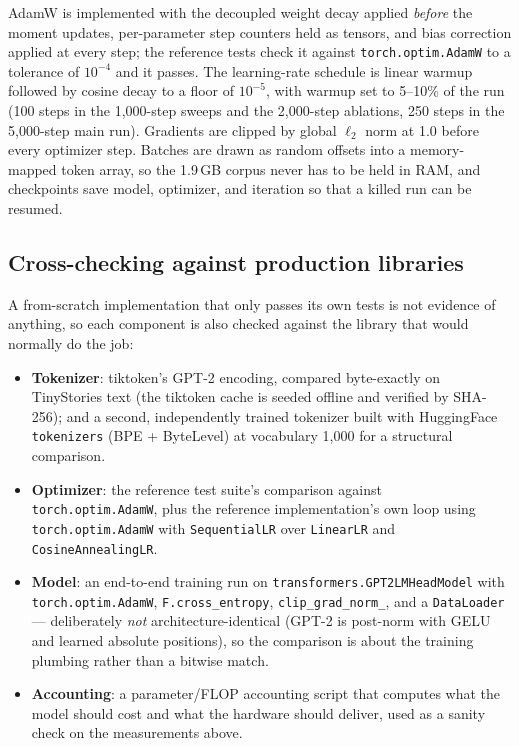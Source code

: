 \documentclass{article}
\begin{document}
AdamW \citep{adamw} is implemented with the decoupled weight decay applied \emph{before} the moment updates, per-parameter step counters held as tensors, and bias correction applied at every step; the reference tests check it against \texttt{torch.optim.AdamW} to a tolerance of $10^{-4}$ and it passes. The learning-rate schedule is linear warmup followed by cosine decay to a floor of $10^{-5}$, with warmup set to 5--10\% of the run (100 steps in the 1{,}000-step sweeps and the 2{,}000-step ablations, 250 steps in the 5{,}000-step main run). Gradients are clipped by global $\ell_2$ norm at 1.0 before every optimizer step. Batches are drawn as random offsets into a memory-mapped token array, so the 1.9\,GB corpus never has to be held in RAM, and checkpoints save model, optimizer, and iteration so that a killed run can be resumed.

\subsection{Cross-checking against production libraries}
\label{sec:xcheck}

A from-scratch implementation that only passes its own tests is not evidence of anything, so each component is also checked against the library that would normally do the job:

\begin{itemize}
  \item \textbf{Tokenizer}: tiktoken's GPT-2 encoding, compared byte-exactly on TinyStories text (the tiktoken cache is seeded offline and verified by SHA-256); and a second, independently trained tokenizer built with HuggingFace \texttt{tokenizers} \citep{hf} (BPE + ByteLevel) at vocabulary 1{,}000 for a structural comparison.
  \item \textbf{Optimizer}: the reference test suite's comparison against \texttt{torch.optim.AdamW}, plus the reference implementation's own loop using \texttt{torch.optim.AdamW} with \texttt{SequentialLR} over \texttt{LinearLR} and \texttt{CosineAnnealingLR}.
  \item \textbf{Model}: an end-to-end training run on \texttt{transformers.GPT2LMHeadModel} with \texttt{torch.optim.AdamW}, \texttt{F.cross\_entropy}, \texttt{clip\_grad\_norm\_}, and a \texttt{DataLoader} --- deliberately \emph{not} architecture-identical (GPT-2 is post-norm with GELU and learned absolute positions), so the comparison is about the training plumbing rather than a bitwise match.
  \item \textbf{Accounting}: a parameter/FLOP accounting script that computes what the model should cost and what the hardware should deliver, used as a sanity check on the measurements above.
\end{itemize}
\end{document}
